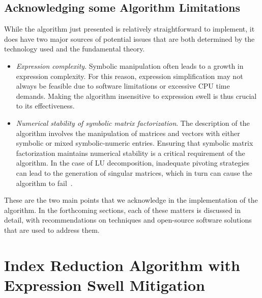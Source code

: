 \subsection{Acknowledging some Algorithm Limitations}

While the algorithm just presented is relatively straightforward to implement, it does have two major sources of potential issues that are both determined by the technology used and the fundamental theory.
%
\begin{itemize}
    \item \emph{Expression complexity}. Symbolic manipulation often leads to a growth in expression complexity. For this reason, expression simplification may not always be feasible due to software limitations or excessive \ac{CPU} time demands. Making the algorithm insensitive to expression swell is thus crucial to its effectiveness.
    \item \emph{Numerical stability of symbolic matrix factorization}. The description of the algorithm involves the manipulation of matrices and vectors with either symbolic or mixed symbolic-numeric entries. Ensuring that symbolic matrix factorization maintains numerical stability is a critical requirement of the algorithm. In the case of \ac{LU} decomposition, inadequate pivoting strategies can lead to the generation of singular matrices, which in turn can cause the algorithm to fail~\cite{zhou2005implicit, zhou2007symbolic, giesbrecht2014symbolic}.
\end{itemize}
%
These are the two main points that we acknowledge in the implementation of the algorithm. In the forthcoming sections, each of these matters is discussed in detail, with recommendations on techniques and open-source software solutions that are used to address them.

\section{Index Reduction Algorithm with Expression Swell Mitigation}

